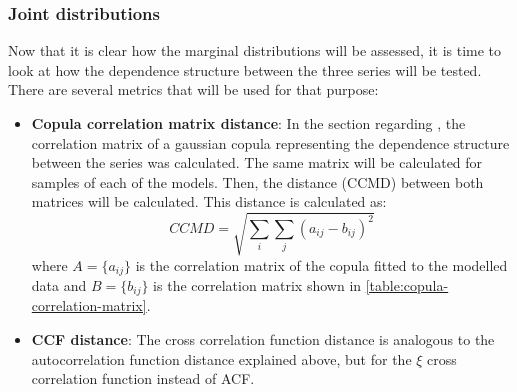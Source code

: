 \subsubsection{Joint distributions}
Now that it is clear how the marginal distributions will be assessed, it is time to look at how the dependence structure between the three series will be tested. There are several metrics that will be used for that purpose:
\begin{itemize}
    \item \textbf{Copula correlation matrix distance}: In the section regarding , the correlation matrix of a gaussian copula representing the dependence structure between the series was calculated. The same matrix will be calculated for samples of each of the models. Then, the distance (CCMD) between both matrices will be calculated. This distance is calculated as:
    \begin{equation}
        CCMD=\sqrt{\sum_i\sum_j\left(a_{ij}-b_{ij}\right)^2}
    \end{equation}
    where $A=\{a_{ij}\}$ is the correlation matrix of the copula fitted to the modelled data and $B=\{b_{ij}\}$ is the correlation matrix shown in \autoref{table:copula-correlation-matrix}.
    \item \textbf{CCF distance}: The cross correlation function distance is analogous to the autocorrelation function distance explained above, but for the $\xi$ cross correlation function instead of ACF.
\end{itemize}

